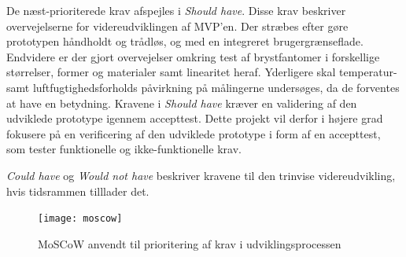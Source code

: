 De næst-prioriterede krav afspejles i \textit{Should have}. Disse krav beskriver overvejelserne for videreudviklingen af MVP'en. Der stræbes efter gøre prototypen håndholdt og trådløs, og med en integreret  brugergrænseflade. Endvidere er der gjort overvejelser omkring test af brystfantomer i forskellige størrelser, former og materialer samt linearitet heraf. Yderligere skal temperatur- samt luftfugtighedsforholds påvirkning på målingerne undersøges, da de forventes at have en  betydning. 
Kravene i \textit{Should have} kræver en validering af den udviklede prototype igennem accepttest. Dette projekt vil derfor i højere grad fokusere på en verificering af den udviklede prototype i form af en accepttest, som tester funktionelle og ikke-funktionelle krav. 

\textit{Could have} og \textit{Would not have} beskriver kravene til den trinvise videreudvikling, hvis tidsrammen tilllader det. 

\begin{figure}[]
\texttt{[image: moscow]}
\caption{MoSCoW anvendt til prioritering af krav i udviklingsprocessen}
\label{fig:moscow}
\end{figure}


